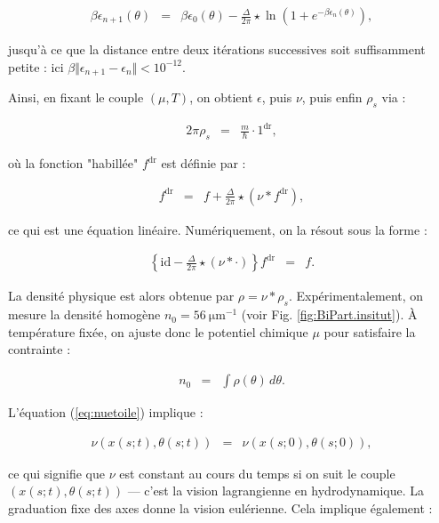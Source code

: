 \begin{eqnarray*}
	\beta \epsilon_{n+1}(\theta) & = & \beta \epsilon_0(\theta) -  \frac{\Delta}{2\pi} \star \ln \left( 1 + e^{-\beta \epsilon_n(\theta)} \right),
\end{eqnarray*}

jusqu'à ce que la distance entre deux itérations successives soit suffisamment petite : ici $\beta \Vert \epsilon_{n+1} - \epsilon_n \Vert < 10^{-12}$.

Ainsi, en fixant le couple $(\mu, T)$, on obtient $\epsilon$, puis $\nu$, puis enfin $\rho_s$ via :

\begin{eqnarray*}
	2\pi \rho_s & = & \frac{m}{\hbar} \cdot 1^{\mathrm{dr}},
\end{eqnarray*}

où la fonction "habillée" $f^{\mathrm{dr}}$ est définie par :

\begin{eqnarray*}
	f^{\mathrm{dr}} & = & f + \frac{\Delta}{2\pi} \star ( \nu \ast f^{\mathrm{dr}} ),
\end{eqnarray*}

ce qui est une équation linéaire. Numériquement, on la résout sous la forme :

\begin{eqnarray*}
	\left\{ \mathrm{id} - \frac{\Delta}{2\pi} \star ( \nu \ast \cdot ) \right\} f^{\mathrm{dr}} & = & f.
\end{eqnarray*}

La densité physique est alors obtenue par $\rho = \nu \ast \rho_s$. Expérimentalement, on mesure la densité homogène $n_0 = 56~\mathrm{\mu m^{-1}}$ (voir Fig. \ref{fig:BiPart.insitut}). À température fixée, on ajuste donc le potentiel chimique $\mu$ pour satisfaire la contrainte :

\begin{eqnarray*}
	n_0 & = & \int \rho(\theta) \, d\theta.
\end{eqnarray*}

L'équation (\ref{eq:nuetoile}) implique :

\begin{eqnarray*}
	\nu(x(s;t), \theta(s;t)) & = & \nu(x(s;0), \theta(s;0)),
\end{eqnarray*}

ce qui signifie que $\nu$ est constant au cours du temps si on suit le couple $(x(s;t), \theta(s;t))$ — c’est la vision lagrangienne en hydrodynamique. La graduation fixe des axes donne la vision eulérienne. Cela implique également :

